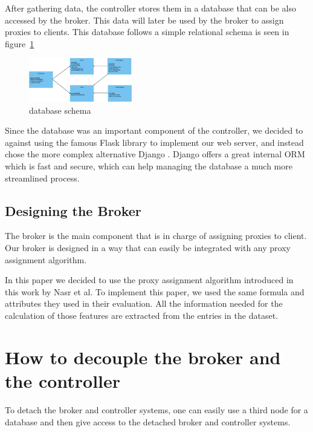 \documentclass[conference]{IEEEtran}
\begin{document}
After gathering data, the controller stores them in a database that can be also accessed by the broker. This data will later be used by the broker to assign proxies to clients. This database follows a simple relational schema is seen in figure~\ref*{fig:schema}

\begin{figure}[h]
    \centering
    \includegraphics[width=0.4\textwidth]{schema.jpeg}
    \caption{database schema}
    \label{fig:schema}
\end{figure}

Since the database was an important component of the controller, we decided to against using the famous Flask library to implement our web server, and instead chose the more complex alternative Django \cite{noauthor_django_nodate}. Django offers a great internal ORM which is fast and secure, which can help managing the database a much more streamlined process.

\subsection{Designing the Broker}
The broker is the main component that is in charge of assigning proxies to client. Our broker is designed in a way that can easily be integrated with any proxy assignment algorithm.

In this paper we decided to use the proxy assignment algorithm introduced in this \cite{nasr2019enemy} work by Nasr et al. To implement this paper, we used the same formula and attributes they used in their evaluation. All the information needed for the calculation of those features are extracted from the entries in the dataset.

\section{How to decouple the broker and the controller}
To detach the broker and controller systems, one can easily use a third node for a database and then give access to the detached broker and controller systems.

\printbibliography
\end{document}
